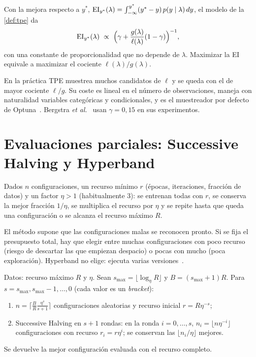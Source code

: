 \begin{proposicion}\label{prop:tpe}
Con la mejora respecto a $y^*$, $\operatorname{EI}_{y^*}(\lambda)=\int_{-\infty}^{y^*}(y^*-y)\,p(y\mid\lambda)\,dy$, el modelo de la \cref{def:tpe} da
\[
\EI_{y^*}(\lambda)\ \propto\ \Bigl(\gamma+\frac{g(\lambda)}{\ell(\lambda)}(1-\gamma)\Bigr)^{-1},
\]
con una constante de proporcionalidad que no depende de $\lambda$. Maximizar la EI equivale a maximizar el cociente $\ell(\lambda)/g(\lambda)$.
\end{proposicion}

En la práctica TPE muestrea muchos candidatos de $\ell$ y se queda con el de mayor cociente $\ell/g$. Su coste es lineal en el número de observaciones, maneja con naturalidad variables categóricas y condicionales, y es el muestreador por defecto de Optuna~\cite{optuna}. Bergstra \emph{et al.}~\cite[§6]{tpe} usan $\gamma=0{,}15$ en sus experimentos.

\section{Evaluaciones parciales: Successive Halving y Hyperband}
\label{sec:hyperband}

\begin{definicion}\label{def:sh}
Dados $n$ configuraciones, un recurso mínimo $r$ (épocas, iteraciones, fracción de datos) y un factor $\eta>1$ (habitualmente 3): se entrenan todas con $r$, se conserva la mejor fracción $1/\eta$, se multiplica el recurso por $\eta$ y se repite hasta que queda una configuración o se alcanza el recurso máximo $R$.
\end{definicion}

El método supone que las configuraciones malas se reconocen pronto. Si se fija el presupuesto total, hay que elegir entre muchas configuraciones con poco recurso (riesgo de descartar las que empiezan despacio) o pocas con mucho (poca exploración). Hyperband no elige: ejecuta varias versiones~\cite[§3.2]{hyperband}.

\begin{algoritmo}[Hyperband]\label{alg:hyperband}
Datos: recurso máximo $R$ y $\eta$. Sean $s_{\max}=\lfloor\log_\eta R\rfloor$ y $B=(s_{\max}+1)R$. Para $s=s_{\max},s_{\max}-1,\dots,0$ (cada valor es un \emph{bracket}):
\begin{enumerate}[label=\arabic*.]
  \item $n=\bigl\lceil\frac{B}{R}\frac{\eta^{s}}{s+1}\bigr\rceil$ configuraciones aleatorias y recurso inicial $r=R\eta^{-s}$;
  \item Successive Halving en $s+1$ rondas: en la ronda $i=0,\dots,s$, $n_i=\lfloor n\eta^{-i}\rfloor$ configuraciones con recurso $r_i=r\eta^{i}$; se conservan las $\lfloor n_i/\eta\rfloor$ mejores.
\end{enumerate}
Se devuelve la mejor configuración evaluada con el recurso completo.
\end{algoritmo}

